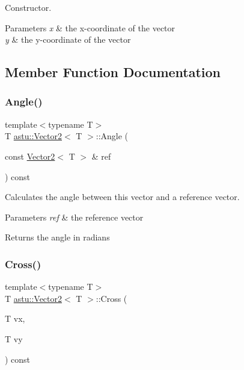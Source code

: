 Constructor.


\begin{DoxyParams}{Parameters}
{\em x} & the x-\/coordinate of the vector \\
\hline
{\em y} & the y-\/coordinate of the vector \\
\hline
\end{DoxyParams}


\subsection{Member Function Documentation}
\mbox{\label{classastu_1_1Vector2_af44c9648648cb03637f520669e9a2d8e}} 
\subsubsection{\texorpdfstring{Angle()}{Angle()}}
{\footnotesize\ttfamily template$<$typename T$>$ \\
T \hyperlink{classastu_1_1Vector2}{astu\+::\+Vector2}$<$ T $>$\+::Angle (\begin{DoxyParamCaption}\item[{const \hyperlink{classastu_1_1Vector2}{Vector2}$<$ T $>$ \&}]{ref }\end{DoxyParamCaption}) const\hspace{0.3cm}{\ttfamily [inline]}}

Calculates the angle between this vector and a reference vector.


\begin{DoxyParams}{Parameters}
{\em ref} & the reference vector \\
\hline
\end{DoxyParams}
\begin{DoxyReturn}{Returns}
the angle in radians 
\end{DoxyReturn}
\mbox{\label{classastu_1_1Vector2_ad7245590bd3a503f0c388cad9008789b}} 
\subsubsection{\texorpdfstring{Cross()}{Cross()}\hspace{0.1cm}{\footnotesize\ttfamily [1/2]}}
{\footnotesize\ttfamily template$<$typename T$>$ \\
T \hyperlink{classastu_1_1Vector2}{astu\+::\+Vector2}$<$ T $>$\+::Cross (\begin{DoxyParamCaption}\item[{T}]{vx,  }\item[{T}]{vy }\end{DoxyParamCaption}) const\hspace{0.3cm}{\ttfamily [inline]}}

